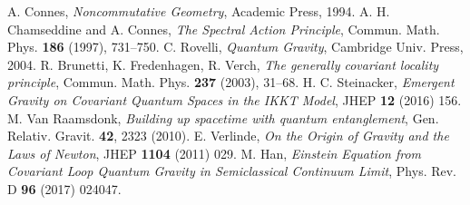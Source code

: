 \documentclass[11pt]{article}
\begin{document}
\begin{thebibliography}{99}\itemsep=-1pt
 A. Connes, \emph{Noncommutative Geometry}, Academic Press, 1994.
 A. H. Chamseddine and A. Connes, \emph{The Spectral Action Principle}, Commun. Math. Phys. \textbf{186} (1997), 731--750.
 C. Rovelli, \emph{Quantum Gravity}, Cambridge Univ. Press, 2004.
 R. Brunetti, K. Fredenhagen, R. Verch, \emph{The generally covariant locality principle}, Commun. Math. Phys. \textbf{237} (2003), 31--68.
 H. C. Steinacker, \emph{Emergent Gravity on Covariant Quantum Spaces in the IKKT Model}, JHEP \textbf{12} (2016) 156.
 M. Van Raamsdonk, \emph{Building up spacetime with quantum entanglement}, Gen. Relativ. Gravit. \textbf{42}, 2323 (2010).
 E. Verlinde, \emph{On the Origin of Gravity and the Laws of Newton}, JHEP \textbf{1104} (2011) 029.
 M. Han, \emph{Einstein Equation from Covariant Loop Quantum Gravity in Semiclassical Continuum Limit}, Phys. Rev. D \textbf{96} (2017) 024047.
\end{thebibliography}
\end{document}

